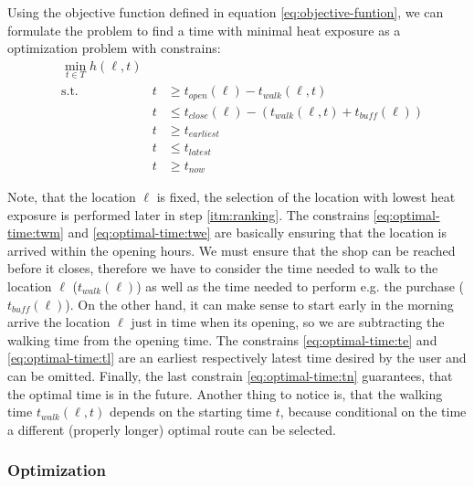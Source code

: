 Using the objective function defined in equation \eqref{eq:objective-funtion}, we can formulate the problem to find a time with minimal heat exposure as a optimization problem with constrains:
\begin{subequations}
	\label{eq:optimal-time}
	\begin{alignat}{2}
	&\min_{t \in T} h(\ell, t) && \label{eq:optimal-time:of} \\
	&\text{s.t.} & t & \geq t_{open}(\ell)-t_{walk}(\ell, t) \label{eq:optimal-time:twm}\\
	&	& t & \leq   t_{close}(\ell)-(t_{walk}(\ell, t)+t_{buff}(\ell))	\label{eq:optimal-time:twe}\\
	&	&  t & \geq t_{earliest} \label{eq:optimal-time:te} \\
	&	&  t & \leq t_{latest} \label{eq:optimal-time:tl} \\
	&  & t  & \geq t_{now} \label{eq:optimal-time:tn} 
	\end{alignat}
\end{subequations}

Note, that the location $\ell$ is fixed, the selection of the location with lowest heat exposure is performed later in step \ref{itm:ranking}. The constrains \eqref{eq:optimal-time:twm} and \eqref{eq:optimal-time:twe} are  basically ensuring that the location is arrived within the opening hours. We must ensure that the shop can be reached before it closes, therefore we have to consider the time needed to walk to the location $\ell$ ($t_{walk}(\ell)$) as well as the time needed to perform e.g. the purchase ($t_{buff}(\ell)$). On the other hand, it can make sense to start early in the morning  arrive the location $\ell$ just in time when its opening, so we are subtracting the walking time from the opening time. The constrains \eqref{eq:optimal-time:te} and \eqref{eq:optimal-time:tl} are an earliest respectively latest time desired by the user and can be omitted. Finally, the last constrain  \eqref{eq:optimal-time:tn}  guarantees, that the optimal time is in the future. Another thing to notice is, that the walking time $t_{walk}(\ell, t)$ depends on the starting time $t$, because conditional on the time a different (properly longer) optimal route can be selected.

 \subsubsection{Optimization \label{sec:optimization}}
 
